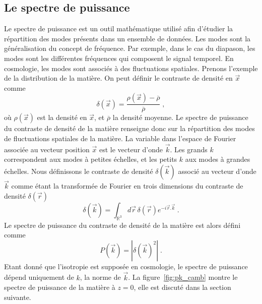 \documentclass[11pt, twoside, a4paper, openright]{report}
\begin{document}
\subsection{Le spectre de puissance}
Le spectre de puissance est un outil mathématique utilisé afin d'étudier la répartition des modes présents dans un ensemble de données. Les modes sont la généralisation du concept de fréquence. Par exemple, dans le cas du diapason, les modes sont les différentes fréquences qui composent le signal temporel. En cosmologie, les modes sont associés à des fluctuations spatiales. Prenons l'exemple de la distribution de la matière. On peut définir le contraste de densité en $\vec x$ comme
\begin{equation}
  \label{eq:contraste}
  \delta(\vec x) = \frac{\rho(\vec x) - \overline \rho}{\overline\rho}  \; ,
\end{equation}
où $\rho(\vec x)$ est la densité en $\vec x$, et $\overline \rho$ la densité moyenne. Le spectre de puissance du contraste de densité de la matière renseigne donc sur la répartition des modes de fluctuations spatiales de la matière. La variable dans l'espace de Fourier associée au vecteur position $\vec x$ est le vecteur d'onde $\vec k$. Les grands $k$ correspondent aux modes à petites échelles, et les petits $k$ aux modes à grandes échelles.
Nous définissons le contraste de densité $\delta(\vec k)$ associé au vecteur d'onde $\vec k$ comme étant la transformée de Fourier en trois dimensions du contraste de densité $\delta(\vec r)$
\begin{equation}
  \label{eq:delta_k}
  \delta(\vec k) = \int_{\mathbb{R}^{3}} d\vec r \,\delta(\vec r) e^{-i \vec r . \vec k} \; .
\end{equation}
Le spectre de puissance du contraste de densité de la matière est alors défini comme
\begin{equation}
  \label{eq:def_pow_spec}
  P(\vec{k}) = | \delta(\vec k)^{2} |  \; .
\end{equation}
Etant donné que l'isotropie est supposée en cosmologie, le spectre de puissance dépend uniquement de $k$, la norme de $\vec{k}$. La figure~\ref{fig:pk_camb} montre le spectre de puissance de la matière à $z=0$, elle est discuté dans la section suivante.
\end{document}
